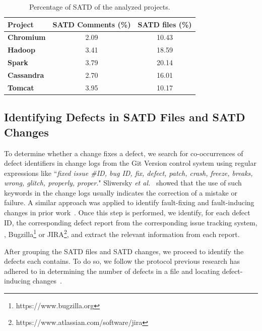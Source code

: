 \begin{table}[tbh]
	\setlength{\tabcolsep}{.7\tabcolsep}
	\centering
	\caption{Percentage of SATD of the analyzed projects.}
	\begin{tabular}{l|c|c}
		\hline
		\textbf{Project}   & \textbf{SATD Comments (\%)} & \textbf{SATD files (\%)} \\ \hline
		\textbf{Chromium}  & 2.09             & 10.43                             \\ \hline
		\textbf{Hadoop}    & 3.41             & 18.59                             \\ \hline
		\textbf{Spark}     & 3.79             & 20.14                             \\ \hline
		\textbf{Cassandra} & 2.70             & 16.01                             \\ \hline
		\textbf{Tomcat}    & 3.95             & 10.17                             \\ \hline
	\end{tabular}
	\label{table:satd_analyzed_projects}
	\vspace{-0.2cm}
\end{table}


\subsection{Identifying Defects in SATD Files and SATD Changes}
\label{ch3_bugs}
To determine whether a change fixes a defect, we search for co-occurrences of defect identifiers in change logs from the Git Version control system using regular expressions like ``\textit{fixed issue \#ID, bug ID, fix, defect, patch, crash,  freeze, breaks, wrong, glitch, properly, proper}."
Sliwersky \textit{et al.}~\cite{sliwerski-msr-2005} showed that the use of such keywords in the change logs usually indicates the correction of a mistake or failure.
A similar  approach  was applied  to  identify  fault-fixing  and
fault-inducing  changes in  prior work~\cite{Kamei-tse-2013,Kim-tse-2008, sliwerski-msr-2005}. Once this step is performed, we identify, for each defect ID, the corresponding defect report from
the corresponding issue tracking system, \ie{}, Bugzilla\footnote{https://www.bugzilla.org} or JIRA\footnote{https://www.atlassian.com/software/jira}, and extract the relevant information from each report.

After grouping the SATD files and SATD changes, we proceed to identify the defects each contains. To do so, we follow the protocol previous research has adhered to in determining the number of defects in a file and locating defect-inducing changes~\cite{Kamei-tse-2013,Kim-tse-2008, sliwerski-msr-2005}.

